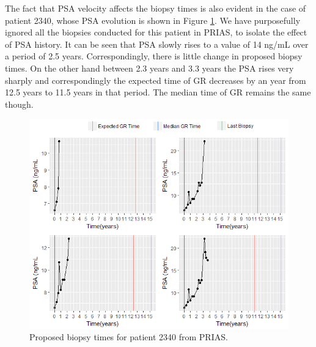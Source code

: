 The fact that PSA velocity affects the biopsy times is also evident in the case of patient 2340, whose PSA evolution is shown in Figure \ref{fig : prias_demo_pid_2340}. We have purposefully ignored all the biopsies conducted for this patient in PRIAS, to isolate the effect of PSA history. It can be seen that PSA slowly rises to a value of 14 ng/mL over a period of 2.5 years. Correspondingly, there is little change in proposed biopsy times. On the other hand between 2.3 years and 3.3 years the PSA rises very sharply and correspondingly the expected time of GR decreases by an year from 12.5 years to 11.5 years in that period. The median time of GR remains the same though.

\begin{figure}[!htb]
\centering
\captionsetup{justification=centering}
\includegraphics[width=\textwidth]{images/prias_demo/case_2340.png}
\caption{\label{fig : prias_demo_pid_2340} Proposed biopsy times for patient 2340 from PRIAS.}
\end{figure}